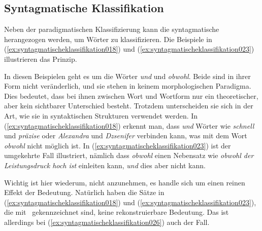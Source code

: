 \subsection{Syntagmatische Klassifikation}
\label{sec:syntagmatischeklassifikation}

Neben der paradigmatischen Klassifizierung kann die syntagmatische herangezogen werden, um Wörter zu klassifizieren.
Die Beispiele in (\ref{ex:syntagmatischeklassifikation018}) und (\ref{ex:syntagmatischeklassifikation023}) illustrieren das Prinzip.

\begin{exe}
  \ex\label{ex:syntagmatischeklassifikation018}
  \begin{xlist}
  \end{xlist}
  \ex\label{ex:syntagmatischeklassifikation023}
  \begin{xlist}
  \end{xlist}
\end{exe}

In diesen Beispielen geht es um die Wörter \textit{und} und \textit{obwohl}.
Beide sind in ihrer Form nicht veränderlich, und sie stehen in keinem morphologischen Paradigma.
Dies bedeutet, dass bei ihnen zwischen Wort und Wortform nur ein theoretischer, aber kein sichtbarer Unterschied besteht.
Trotzdem unterscheiden sie sich in der Art, wie sie in syntaktischen Strukturen verwendet werden.
In (\ref{ex:syntagmatischeklassifikation018}) erkennt man, dass \textit{und} Wörter wie \textit{schnell} und \textit{präzise} oder \textit{Alexandra} und \textit{Dzsenifer} verbinden kann, was mit dem Wort \textit{obwohl} nicht möglich ist.
In (\ref{ex:syntagmatischeklassifikation023}) ist der umgekehrte Fall illustriert, nämlich dass \textit{obwohl} einen Nebensatz wie \textit{obwohl der Leistungsdruck hoch ist} einleiten kann, \textit{und} dies aber nicht kann.

Wichtig ist hier wiederum, nicht anzunehmen, es handle sich um einen reinen Effekt der Bedeutung.
Natürlich haben die Sätze in (\ref{ex:syntagmatischeklassifikation018}) und (\ref{ex:syntagmatischeklassifikation023}), die mit \Ast\ gekennzeichnet sind, keine rekonstruierbare Bedeutung.
Das ist allerdings bei (\ref{ex:syntagmatischeklassifikation026}) auch der Fall.

